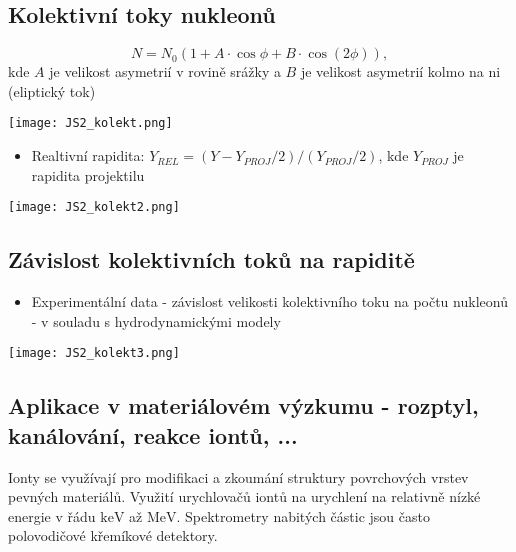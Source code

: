 \documentclass[../../main.tex]{subfiles}
\begin{document}
\subsection{Kolektivní toky nukleonů}

\begin{equation}
N = N_0 (1 + A \cdotp \cos \phi + B \cdotp \cos (2 \phi)),
\end{equation}
kde $A$ je velikost asymetrií v rovině srážky a $B$ je velikost asymetrií kolmo na ni (eliptický tok)

\begin{center}
	\texttt{[image: JS2\_kolekt.png]}
\end{center}

\begin{itemize}
	\item Realtivní rapidita:  $Y_{REL} = (Y - Y_{PROJ}/2) /(Y_{PROJ}/2)$, kde $Y_{PROJ}$ je rapidita projektilu
\end{itemize}

\begin{center}
	\texttt{[image: JS2\_kolekt2.png]}
\end{center}

\subsection{Závislost kolektivních toků na rapiditě}

\begin{itemize}
    \item Experimentální data - závislost velikosti kolektivního toku na počtu nukleonů - v souladu s hydrodynamickými modely
\end{itemize}

\begin{center}
	\texttt{[image: JS2\_kolekt3.png]}
\end{center}

\subsection{Aplikace v materiálovém výzkumu - rozptyl, kanálování, reakce iontů, ...}

Ionty se využívají pro modifikaci a zkoumání struktury povrchových vrstev pevných materiálů. Využití urychlovačů iontů na urychlení na relativně nízké energie v řádu $\mathrm{keV}$ až $\mathrm{MeV}$. Spektrometry nabitých částic jsou často polovodičové křemíkové detektory.  
\end{document}

